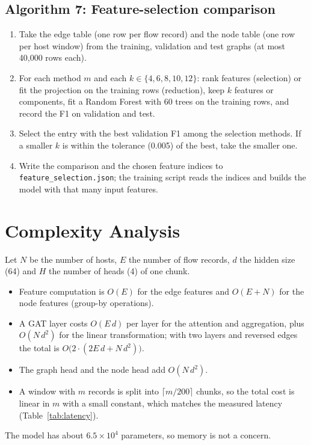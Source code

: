 \subsection{Algorithm 7: Feature-selection comparison}
\begin{enumerate}[label=\arabic*.]
	\item Take the edge table (one row per flow record) and the node table (one row per host window) from the training, validation and test graphs (at most 40,000 rows each).
	\item For each method $m$ and each $k\in\{4,6,8,10,12\}$: rank features (selection) or fit the projection on the training rows (reduction), keep $k$ features or components, fit a Random Forest with 60 trees on the training rows, and record the F1 on validation and test.
	\item Select the entry with the best validation F1 among the selection methods. If a smaller $k$ is within the tolerance (0.005) of the best, take the smaller one.
	\item Write the comparison and the chosen feature indices to \texttt{feature\_selection.json}; the training script reads the indices and builds the model with that many input features.
\end{enumerate}

\section{Complexity Analysis}
Let $N$ be the number of hosts, $E$ the number of flow records, $d$ the hidden size (64) and $H$ the number of heads (4) of one chunk.
\begin{itemize}
	\item Feature computation is $O(E)$ for the edge features and $O(E+N)$ for the node features (group-by operations).
	\item A GAT layer costs $O(E\,d)$ per layer for the attention and aggregation, plus $O(N\,d^2)$ for the linear transformation; with two layers and reversed edges the total is $O\big(2\cdot(2E\,d+N\,d^2)\big)$.
	\item The graph head and the node head add $O(N\,d^2)$.
	\item A window with $m$ records is split into $\lceil m/200\rceil$ chunks, so the total cost is linear in $m$ with a small constant, which matches the measured latency (Table~\ref{tab:latency}).
\end{itemize}
The model has about $6.5\times10^4$ parameters, so memory is not a concern.

